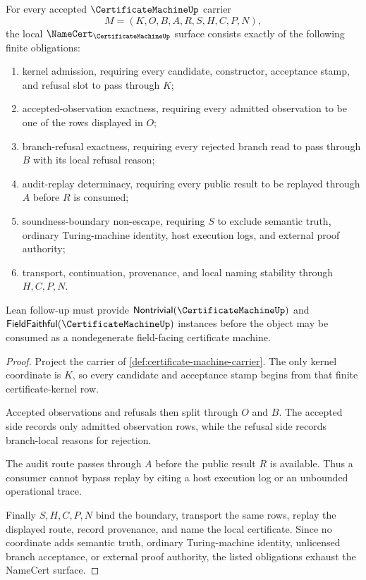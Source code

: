 \begin{theorem}
\label{thm:certificate-machine-namecert-obligations}
For every accepted $\CertificateMachineUp$ carrier
$$
M=(K,O,B,A,R,S,H,C,P,N),
$$
the local $\NameCert_{\CertificateMachineUp}$ surface consists exactly of the following finite obligations:
\begin{enumerate}
\item kernel admission, requiring every candidate, constructor, acceptance stamp, and refusal slot to pass through $K$;
\item accepted-observation exactness, requiring every admitted observation to be one of the rows displayed in $O$;
\item branch-refusal exactness, requiring every rejected branch read to pass through $B$ with its local refusal reason;
\item audit-replay determinacy, requiring every public result to be replayed through $A$ before $R$ is consumed;
\item soundness-boundary non-escape, requiring $S$ to exclude semantic truth, ordinary Turing-machine identity, host execution logs, and external proof authority;
\item transport, continuation, provenance, and local naming stability through $H,C,P,N$.
\end{enumerate}
Lean follow-up must provide $\mathsf{Nontrivial}(\CertificateMachineUp)$ and $\mathsf{FieldFaithful}(\CertificateMachineUp)$ instances before the object may be consumed as a nondegenerate field-facing certificate machine.
\end{theorem}
\begin{proof}
Project the carrier of \autoref{def:certificate-machine-carrier}. The only kernel coordinate is $K$, so every candidate and acceptance stamp begins from that finite certificate-kernel row.

Accepted observations and refusals then split through $O$ and $B$. The accepted side records only admitted observation rows, while the refusal side records branch-local reasons for rejection.

The audit route passes through $A$ before the public result $R$ is available. Thus a consumer cannot bypass replay by citing a host execution log or an unbounded operational trace.

Finally $S,H,C,P,N$ bind the boundary, transport the same rows, replay the displayed route, record provenance, and name the local certificate. Since no coordinate adds semantic truth, ordinary Turing-machine identity, unlicensed branch acceptance, or external proof authority, the listed obligations exhaust the NameCert surface.
\end{proof}

